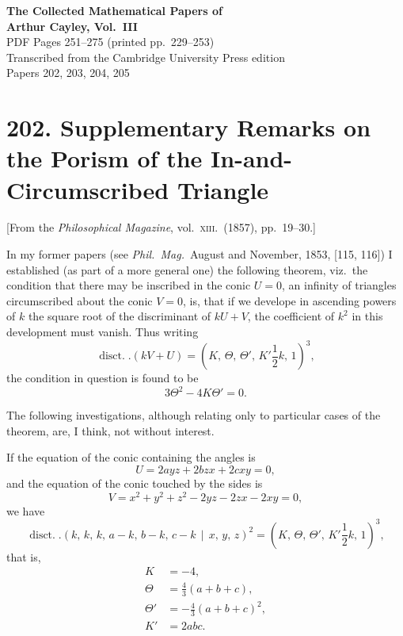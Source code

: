 \documentclass[12pt,a4paper]{article}
\providecommand{\disct}{\mathop{\mathrm{disct.}}}
\theoremstyle{plain}
\begin{document}
\begin{center}
{\Large\bfseries The Collected Mathematical Papers of\\[0.5em] Arthur Cayley, Vol.~III}\\[2em]
{\large PDF Pages 251--275 (printed pp.~229--253)}\\[1em]
{\normalsize Transcribed from the Cambridge University Press edition}\\[0.5em]
{\small Papers 202, 203, 204, 205}
\end{center}

\vspace{2em}

\tableofcontents
\newpage


\section*{202. Supplementary Remarks on the Porism of the In-and-Circumscribed Triangle}

\begin{center}
[From the \textit{Philosophical Magazine}, vol.~\textsc{xiii}.\ (1857), pp.~19--30.]
\end{center}

\medskip

\noindent In my former papers (see \textit{Phil.\ Mag.}\ August and November, 1853, [115, 116]) I established (as part of a more general one) the following theorem, viz.\ the condition that there may be inscribed in the conic $U=0$, an infinity of triangles circumscribed about the conic $V=0$, is, that if we develope in ascending powers of $k$ the square root of the discriminant of $kU+V$, the coefficient of $k^2$ in this development must vanish. Thus writing
\[
\disct.(kV+U)=(K,\,\Theta,\,\Theta',\,K'\!\textstyle\frac{1}{2}k,\,1)^3,
\]
the condition in question is found to be
\[
3\Theta^2-4K\Theta'=0.
\]

The following investigations, although relating only to particular cases of the theorem, are, I think, not without interest.

\medskip

If the equation of the conic containing the angles is
\[
U=2ayz+2bzx+2cxy=0,
\]
and the equation of the conic touched by the sides is
\[
V=x^2+y^2+z^2-2yz-2zx-2xy=0,
\]
we have
\[
\disct.(k,\,k,\,k,\,a-k,\,b-k,\,c-k\,\mid\,x,\,y,\,z)^2=(K,\,\Theta,\,\Theta',\,K'\!\textstyle\frac{1}{2}k,\,1)^3,
\]
that is,
\begin{align*}
K&=-4,\\
\Theta&=\tfrac{4}{3}(a+b+c),\\
\Theta'&=-\tfrac{4}{3}(a+b+c)^2,\\
K'&=2abc.
\end{align*}
\end{document}
